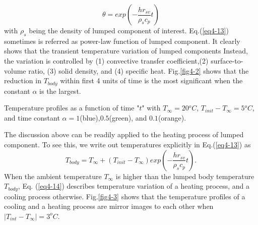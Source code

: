 \begin{equation}
    \theta=exp\left(-\frac{hr_{sv}}{\rho_sc_p}t\right)
    \label{eq4-13}
\end{equation}
with $\rho_s$ being the density of lumped component of interest. Eq.(\ref{eq4-13}) sometimes is referred as power-law function of lumped component. It clearly shows that the transient temperature variation of lumped components  Instead, the variation is controlled by (1) convective transfer coefficient,(2) surface-to-volume ratio, (3) solid density, and (4) specific heat.  Fig.\ref{fig4-2} shows that the reduction in $T_{body}$ within first 4 units of time is the most significant when the constant $\alpha$ is the largest.
\begin{marginfigure}
\caption{Temperature profiles as a function of time "$t$" with $T_{\infty}=20{}^oC$, $T_{init}-T_{\infty}=5{}^oC$, and time constant $\alpha=1$(blue),$0.5$(green), and $0.1$(orange).}
\label{fig4-2}
\end{marginfigure}
The discussion above can be readily applied to the heating process of lumped component. To see this, we write out temperatures explicitly in Eq.(\ref{eq4-13}) as
\begin{equation}
    T_{body}=T_{\infty}+\left(T_{init}-T_{\infty}\right)exp\left(-\frac{hr_{sv}}{\rho_sc_p}t\right).
    \label{eq4-14}
\end{equation}
When the ambient temperature $T_{\infty}$ is higher than the lumped body temperature $T_{body}$, Eq. (\ref{eq4-14}) describes temperature variation of a heating process, and a cooling process otherwise. Fig.\ref{fig4-3} shows that the temperature profiles of a cooling and a heating process are mirror images to each other when $|T_{int}-T_{\infty}|=3^oC$.
